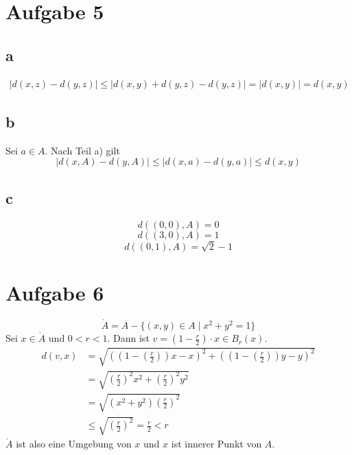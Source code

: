 \documentclass[10pt,a4paper]{article}
\begin{document}
\section*{Aufgabe 5}

\subsection*{a}

\begin{align}
|d(x, z) - d(y, z)| \le |d(x, y) + d(y, z) - d(y, z)| = |d(x, y)| = d(x, y)
\end{align}

\subsection*{b}

Sei $a \in A$.
Nach Teil a) gilt
\begin{equation}
|d(x, A) - d(y, A)| \le |d(x, a) - d(y, a)| \le d(x, y)
\end{equation}

\subsection*{c}

\begin{equation}
d((0, 0), A) = 0
\end{equation}
\begin{equation}
d((3, 0), A) = 1
\end{equation}
\begin{equation}
d((0, 1), A) = \sqrt{2} - 1
\end{equation}

\section*{Aufgabe 6}

\begin{equation}
\mathring{A} = A - \{(x, y) \in A \mid x^{2} + y^{2} = 1\}
\end{equation}
Sei $x \in \mathring{A}$ und $0 < r < 1$.
Dann ist $v = (1 - \frac{r}{2}) \cdot x \in B_{r}(x)$.
\begin{align}
d(v, x) & = \sqrt{((1 - (\frac{r}{2}))x - x)^{2} + ((1 - (\frac{r}{2}))y - y)^{2}}\\
& = \sqrt{(\frac{r}{2})^{2}x^2 + (\frac{r}{2})^2 y^2}\\
& = \sqrt{(x^2 + y^2)(\frac{r}{2})^2}\\
& \le \sqrt{(\frac{r}{2})^2} = \frac{r}{2} < r
\end{align}
$\mathring{A}$ ist also eine Umgebung von $x$ und $x$ ist innerer Punkt von $A$.
\end{document}
